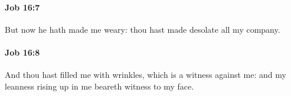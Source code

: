 		\paragraph{Job 16:7} %
			\label{JOB-16-7}

			But now he hath made me weary: thou hast made desolate all my company.


		\paragraph{Job 16:8} %
			\label{JOB-16-8}

			And thou hast filled me with wrinkles, which is a witness against me: and my leanness rising up in me beareth witness to my face.


